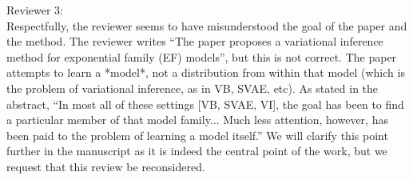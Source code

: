 \documentclass{article}
\begin{document}
Reviewer 3: \\

Respectfully, the reviewer seems to have misunderstood the goal of the paper and the method.  The reviewer writes “The paper proposes a variational inference method for exponential family (EF) models”, but this is not correct.  The paper attempts to learn a *model*, not a distribution from within that model (which is the problem of variational inference, as in VB, SVAE, etc).  As stated in the abstract, “In most all of these settings [VB, SVAE, VI], the goal has been to find a particular member of that model family... Much less attention, however, has been paid to the problem of learning a model itself.”  We will clarify this point further in the manuscript as it is indeed the central point of the work, but we request that this review be reconsidered.
\end{document}
